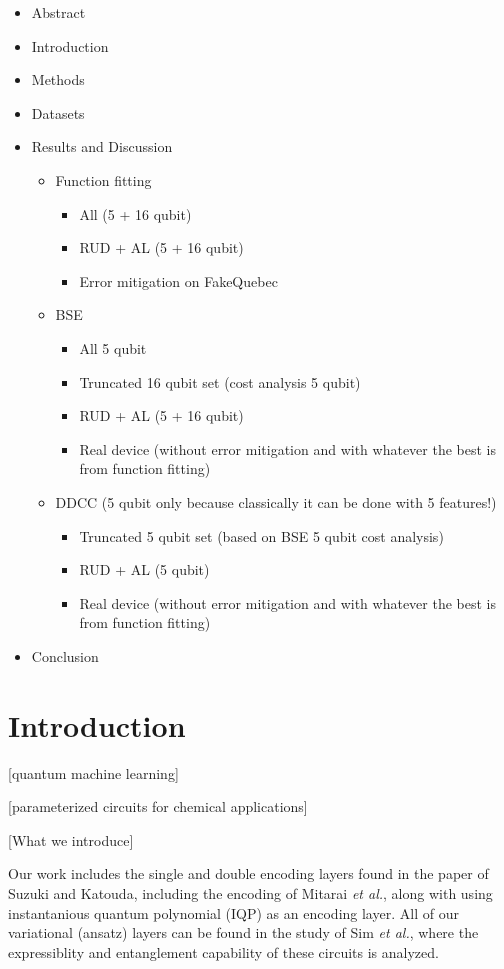 \documentclass[journal=jacsat,manuscript=article]{achemso}
\begin{document}
\newpage
\begin{itemize}
	\item Abstract
	\item Introduction
	\item Methods
	\item Datasets
	\item Results and Discussion
	\begin{itemize}
		\item Function fitting 
		\begin{itemize}
			\item All (5 + 16 qubit)
			\item RUD + AL (5 + 16 qubit)
			\item Error mitigation on FakeQuebec
		\end{itemize}
		\item BSE
		\begin{itemize}
			\item All 5 qubit
			\item Truncated 16 qubit set (cost analysis 5 qubit)
			\item RUD + AL (5 + 16 qubit)
			\item Real device (without error mitigation and with whatever the best is from function fitting)
		\end{itemize}		
		\item DDCC (5 qubit only because classically it can be done with 5 features!)
		\begin{itemize}
			\item Truncated  5 qubit set (based on BSE 5 qubit cost analysis)
			\item RUD + AL (5 qubit)
			\item Real device (without error mitigation and with whatever the best is from function fitting)
		\end{itemize}				
	\end{itemize}
	\item Conclusion
\end{itemize}

\newpage
\section{Introduction}
[quantum machine learning]


[parameterized circuits for chemical applications]

[What we introduce]

Our work includes the single and double encoding layers found in the paper of Suzuki and Katouda\cite{suzuki_predicting_2020}, including the encoding of Mitarai \textit{et al.}\cite{mitarai_quantum_2018}, along with using instantanious quantum polynomial (IQP) as an encoding layer. \cite{bremner_average-case_2015}
All of our variational (ansatz) layers can be found in the study of Sim \textit{et al.}\cite{sim_expressibility_2019}, where the expressiblity and entanglement capability of these circuits is analyzed.
\end{document}
